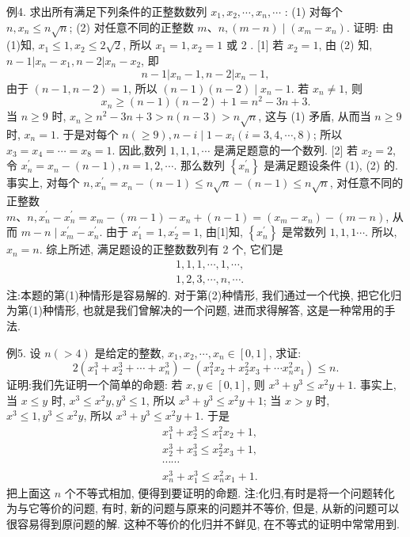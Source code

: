 例4. 求出所有满足下列条件的正整数数列 $x_1, x_2, \cdots, x_n, \cdots$ :
(1) 对每个 $n, x_n \leqslant n \sqrt{n}$;
(2) 对任意不同的正整数 $m 、 n,(m-n) \mid\left(x_m-x_n\right)$.
证明: 由(1)知, $x_1 \leqslant 1, x_2 \leqslant 2 \sqrt{2}$, 所以 $x_1=1, x_2=1$ 或 2 .
[1] 若 $x_2=1$, 由 (2) 知, $n-1\left|x_n-x_1, n-2\right| x_n-x_2$, 即
$$
n-1\left|x_n-1, n-2\right| x_n-1,
$$
由于 $(n-1, n-2)=1$, 所以 $(n-1)(n-2) \mid x_n-1$.
若 $x_n \neq 1$, 则
$$
x_n \geqslant(n-1)(n-2)+1=n^2-3 n+3 .
$$
当 $n \geqslant 9$ 时, $x_n \geqslant n^2-3 n+3>n(n-3)>n \sqrt{n}$, 这与 (1) 矛盾, 从而当 $n \geqslant 9$ 时, $x_n=1$.
于是对每个 $n(\geqslant 9), n-i \mid 1-x_i(i=3,4, \cdots, 8)$; 所以 $x_3= x_4=\cdots=x_8=1$.
因此,数列 $1,1,1, \cdots$ 是满足题意的一个数列.
[2] 若 $x_2=2$, 令 $x_n^{\prime}=x_n-(n-1), n=1,2, \cdots$. 那么数列 $\left\{x_n^{\prime}\right\}$ 是满足题设条件 (1), (2) 的.
事实上, 对每个 $n, x_n^{\prime}=x_n-(n-1) \leqslant n \sqrt{n}-(n-1) \leqslant n \sqrt{n}$, 对任意不同的正整数 $m 、 n, x_n^{\prime}-x_n^{\prime}=x_m-(m-1)-x_n+(n-1)=\left(x_m-x_n\right)- (m-n)$, 从而 $m-n \mid x_m^{\prime}-x_n^{\prime}$.
由于 $x_1^{\prime}=1, x_2^{\prime}=1$, 由[1]知, $\left\{x_n^{\prime}\right\}$ 是常数列 $1,1,1 \cdots$. 所以, $x_n=n$.
综上所述, 满足题设的正整数数列有 2 个, 它们是
$$
\begin{aligned}
& 1,1,1, \cdots, 1, \cdots, \\
& 1,2,3, \cdots, n, \cdots .
\end{aligned}
$$
注:本题的第(1)种情形是容易解的.
对于第(2)种情形, 我们通过一个代换, 把它化归为第(1)种情形, 也就是我们曾解决的一个问题, 进而求得解答, 这是一种常用的手法.



例5. 设 $n(>4)$ 是给定的整数, $x_1, x_2, \cdots, x_n \in[0,1]$, 求证:
$$
2\left(x_1^3+x_2^3+\cdots+x_n^3\right)-\left(x_1^2 x_2+x_2^2 x_3+\cdots x_n^2 x_1\right) \leqslant n .
$$
证明:我们先证明一个简单的命题: 若 $x, y \in[0,1]$, 则 $x^3+y^3 \leqslant x^2 y+1$.
事实上,当 $x \leqslant y$ 时, $x^3 \leqslant x^2 y, y^3 \leqslant 1$, 所以 $x^3+y^3 \leqslant x^2 y+1$;
当 $x>y$ 时, $x^3 \leqslant 1, y^3 \leqslant x^2 y$, 所以 $x^3+y^3 \leqslant x^2 y+1$.
于是
$$
\begin{aligned}
& x_1^3+x_2^3 \leqslant x_1^2 x_2+1, \\
& x_2^3+x_3^3 \leqslant x_2^2 x_3+1, \\
& \cdots \cdots \\
& x_n^3+x_1^3 \leqslant x_n^2 x_1+1 .
\end{aligned}
$$
把上面这 $n$ 个不等式相加, 便得到要证明的命题.
注:化归,有时是将一个问题转化为与它等价的问题, 有时, 新的问题与原来的问题并不等价, 但是, 从新的问题可以很容易得到原问题的解.
这种不等价的化归并不鲜见, 在不等式的证明中常常用到.



